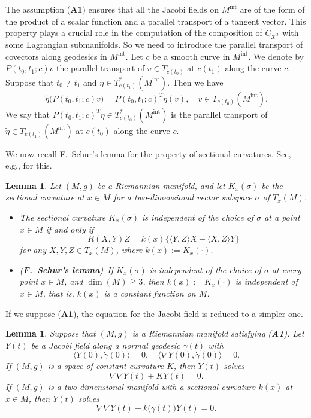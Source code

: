 \documentclass[a4paper,11pt,reqno]{amsart}
\numberwithin{equation}{section}
\newtheorem{lemma}[theorem]{Lemma}
\theoremstyle{definition}
\theoremstyle{remark}
\begin{document}
%
%
The assumption ({\bf A1}) ensures that all the Jacobi fields on $M^\text{int}$ 
are of the form of the product of a scalar function and a parallel transport of a tangent vector. This property plays a crucial role in the computation of the composition of $C_{\mathcal{X}^T}$ with some Lagrangian submanifolds. So we need to introduce the parallel transport of covectors along geodesics in $M^\text{int}$. Let $c$ be a smooth curve in $M^\text{int}$. 
We denote by $P(t_0,t_1;c)v$ the parallel transport of $v \in T_{c(t_0)}$ at $c(t_1)$ along the curve $c$.  
Suppose that $t_0{\ne}t_1$ and 
$\tilde{\eta} \in T^\ast_{c(t_1)}(M^\text{int})$. 
Then we have 
%
%
$$
\tilde{\eta} \bigl(P(t_0,t_1;c)v\bigr)
=
P(t_0,t_1;c)^T\tilde{\eta}(v),
\quad
v \in T_{c(t_0)}(M^\text{int}).
$$ 
%
%
We say that $P(t_0,t_1;c)^T\tilde{\eta} \in T^\ast_{c(t_0)}(M^\text{int})$ is the parallel transport of 
$\tilde{\eta} \in T_{c(t_1)}(M^\text{int})$ at $c(t_0)$ along the curve $c$. 
%
%
\par
%
%
We now recall F.~Schur's lemma for the property of sectional curvatures. 
See, e.g., \cite[Proposition~3.6 in page~46]{Sakai} for this. 
%
%
\begin{lemma}
\label{theorem:schur} 
Let $(M,g)$ be a Riemannian manifold, 
and let $K_x(\sigma)$ be the sectional curvature at $x \in M$ 
for a two-dimensional vector subspace $\sigma$ of $T_x(M)$. 
%
%
\begin{itemize}
\item 
The sectional curvature $K_x(\sigma)$ is independent of the choice of $\sigma$ 
at a point $x \in M$ if and only if 
%
%
$$
R(X,Y)Z
=
k(x)
\{
\langle{Y,Z}\rangle{X}
-
\langle{X,Z}\rangle{Y}
\}
$$
%
% 
for any $X,Y,Z \in T_x(M)$, where $k(x):=K_x(\cdot)$. 
\item
{\rm ({\bf F.~Schur's lemma})}\ 
If $K_x(\sigma)$ is independent of the choice of 
$\sigma$ at every point $x \in M$, and $\operatorname{dim}(M)\geqq3$, 
then $k(x):=K_x(\cdot)$ is independent of $x \in M$, that is, 
$k(x)$ is a constant function on $M$.  
\end{itemize}
%
% 
\end{lemma}
%
%
If we suppose ({\bf A1}), the equation for the Jacobi field is reduced to a simpler one. 
%
%
\begin{lemma}
\label{theorem:jacobi1}
Suppose that $(M,g)$ is a Riemannian manifold satisfying {\rm ({\bf A1})}. 
Let $Y(t)$ be a Jacobi field along a normal geodesic $\gamma(t)$ with 
%
%
$$
\langle{Y(0),\dot{\gamma}(0)}\rangle=0,
\quad
\langle{{\nabla}Y(0),\dot{\gamma}(0)}\rangle=0. 
$$
%
%
If $(M,g)$ is a space of constant curvature $K$, then $Y(t)$ solves 
%
%
$$
\nabla\nabla{Y(t)}+KY(t)=0.
$$
%
%
If $(M,g)$ is a two-dimensional manifold 
with a sectional curvature $k(x)$ at $x \in M$, 
then $Y(t)$ solves 
%
%
$$
\nabla\nabla{Y(t)}+k\bigl(\gamma(t)\bigr)Y(t)=0.
$$
%
%
\end{lemma} 
\end{document}
